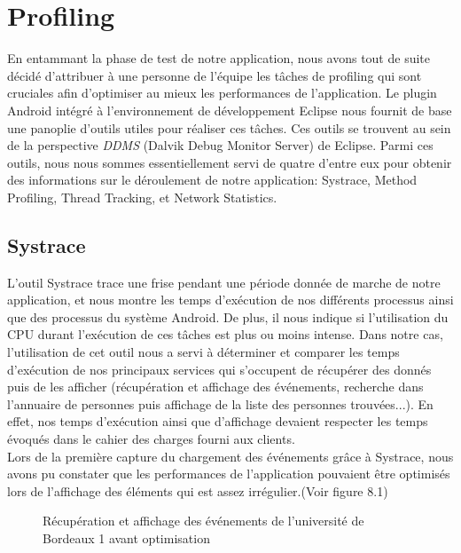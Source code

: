 \chapter{Profiling}
En entammant la phase de test de notre application, nous avons tout de suite décidé d'attribuer à une personne de l'équipe les tâches de profiling qui sont cruciales afin d'optimiser au mieux les performances de l'application. 
Le plugin Android intégré à l'environnement de développement Eclipse nous fournit de base une panoplie d'outils utiles pour réaliser ces tâches. Ces outils se trouvent au sein de la perspective \emph{DDMS} (Dalvik Debug Monitor Server) de Eclipse.
Parmi ces outils, nous nous sommes essentiellement servi de quatre d’entre eux pour obtenir des informations sur le déroulement de notre application: Systrace, Method Profiling, Thread Tracking, et Network Statistics.
 
\section{Systrace}
L'outil Systrace trace une frise pendant une période donnée de marche de notre application, et nous montre les temps d'exécution de nos différents processus ainsi que des processus du système Android. De plus, il nous indique si l'utilisation du CPU durant l'exécution de ces tâches est plus ou moins intense. Dans notre cas, l'utilisation de cet outil nous a servi à déterminer et comparer les temps d'exécution de nos principaux services qui s'occupent de récupérer des donnés puis de les afficher (récupération et affichage des événements, recherche dans l'annuaire de personnes puis affichage de la liste des personnes trouvées...). En effet, nos temps d'exécution ainsi que d'affichage devaient respecter les temps évoqués dans le cahier des charges fourni aux clients. \\
Lors de la première capture du chargement des événements grâce à Systrace, nous avons pu constater que les performances de l'application pouvaient être optimisés lors de l'affichage des éléments qui est assez irrégulier.(Voir figure 8.1)

\begin{figure}[h!]
  \label{fig:systrace_non_optim}
  \center
  \setlength\fboxsep{5pt}
  \setlength\fboxrule{0.5pt}
  \caption{Récupération et affichage des événements de l'université de Bordeaux 1 avant optimisation}
\end{figure}

